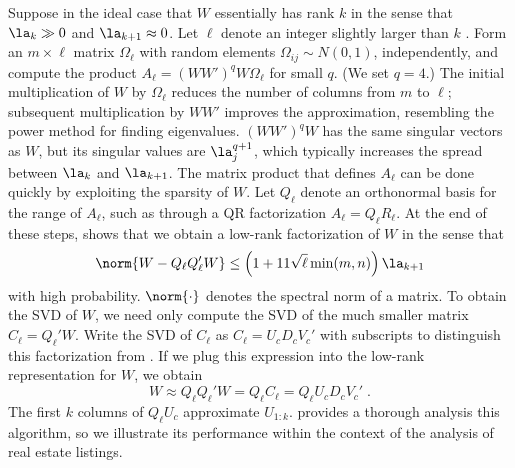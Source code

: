 \documentclass[12pt]{article}
\begin{document}
 
 Suppose in the ideal case that $W$ essentially has rank $k$ in the sense that
 $\la_k \gg 0$ and $\la_{k+1} \approx 0$.  Let $\ell$ denote an integer slightly
 larger than $k$ \citep[see][for the details]{tropp10}.  Form an $m \times \ell$
 matrix $\Omega_{\ell}$ with random elements $\Omega_{ij} \sim N(0,1)$,
 independently, and compute the product $A_{\ell} = (W W')^q W \Omega_{\ell}$
 for small $q$.  (We set $q = 4$.)  The initial multiplication of $W$ by
 $\Omega_\ell$ reduces the number of columns from $m$ to $\ell$; subsequent
 multiplication by $W W'$ improves the approximation, resembling the power
 method for finding eigenvalues. $(W W')^q W$ has the same singular vectors as
 $W$, but its singular values are $\la_j^{q+1}$, which typically increases the
 spread between $\la_k$ and $\la_{k+1}$.  The matrix product that defines
 $A_\ell$ can be done quickly by exploiting the sparsity of $W$.  Let $Q_{\ell}$
 denote an orthonormal basis for the range of $A_{\ell}$, such as through a QR
 factorization $A_\ell = Q_\ell R_\ell$.  At the end of these steps,
 \citet{tropp10} shows that we obtain a low-rank factorization of $W$ in the
 sense that
 \begin{equation}
   \norm{W - Q_{\ell} Q_\ell' W} \le  \left(1+11 \sqrt{\ell} \min(m,n)\right) \la_{k+1}
 \label{tropp}
 \end{equation}
 with high probability.  $\norm{\cdot}$ denotes the spectral norm of a matrix.
  To obtain the SVD of $W$, we need only compute the SVD of the much smaller
 matrix $C_\ell = Q_\ell'W$.  Write the SVD of $C_\ell$ as $C_\ell = U_c D_c
 V_c'$ with subscripts to distinguish this factorization from .  If we
 plug this expression into the low-rank representation for $W$, we obtain
\begin{equation*}
     W \approx Q_{\ell} Q_\ell' W = Q_\ell C_\ell = Q_\ell U_c D_c V_c' \;.
\end{equation*}
The first $k$ columns of $Q_\ell U_c$ approximate  $U_{1:k}$. \citet{tropp10}
 provides a thorough analysis this algorithm, so we
 illustrate its performance within the context of the analysis of real estate listings.
\end{document}
